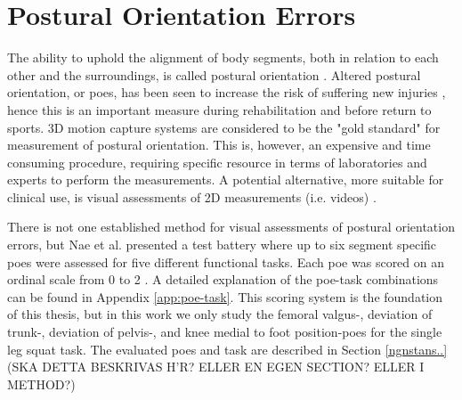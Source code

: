 
\section{Postural Orientation Errors}
The ability to uphold the alignment of body segments, both in relation to each other and the surroundings, is called postural orientation \cite{Horak2006}. Altered postural orientation, or \glspl{poe}, has been seen to increase the risk of suffering new injuries \cite{Hewett2005}, hence this is an important measure during rehabilitation and before return to sports. 3D motion capture systems are considered to be the "gold standard" for measurement of postural orientation. This is, however, an expensive and time consuming procedure, requiring specific resource in terms of laboratories and experts to perform the measurements. A potential alternative, more suitable for clinical use, is visual assessments of 2D measurements (i.e. videos) \cite{Nae2020}.

There is not one established method for visual assessments of postural orientation errors, but Nae et al. presented a test battery where up to six segment specific \glspl{poe} were assessed for five different functional tasks. Each \gls{poe} was scored on an ordinal scale from 0 to 2 \cite{Nae2017, Nae2020b}. A detailed explanation of the \gls{poe}-task combinations can be found in Appendix \ref{app:poe-task}. This scoring system is the foundation of this thesis, but in this work we only study the femoral valgus-, deviation of trunk-, deviation of pelvis-, and knee medial to foot position-\glspl{poe} for the single leg squat task. The evaluated \glspl{poe} and task are described in Section \ref{ngnstans..} (SKA DETTA BESKRIVAS H'R? ELLER EN EGEN SECTION? ELLER I METHOD?)


